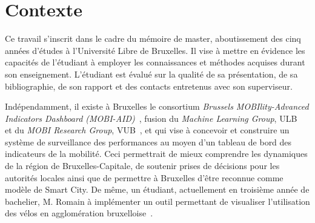 \section{Contexte}

Ce travail s'inscrit dans le cadre du mémoire de master, aboutissement des cinq années d'études à l'Université Libre de Bruxelles. Il vise à mettre en évidence les capacités de l'étudiant à employer les connaissances et méthodes acquises durant son enseignement. L'étudiant est évalué sur la qualité de sa présentation, de sa bibliographie, de son rapport et des contacts entretenus avec son superviseur.

Indépendamment, il existe à Bruxelles le consortium \textit{Brussels MOBIlity-Advanced Indicators
Dashboard (MOBI-AID)}~\cite{MobiAid}, fusion du \textit{Machine Learning Group}, ULB~\cite{MLG} et du \textit{MOBI Research Group}, VUB~\cite{MOBI}, et qui vise à concevoir et construire un système de surveillance des performances au moyen d'un tableau de bord des indicateurs de la mobilité. Ceci permettrait de mieux comprendre les dynamiques de la région de Bruxelles-Capitale, de soutenir prises de décisions pour les autorités locales ainsi que de permettre à Bruxelles d'être reconnue comme modèle de Smart City. De même, un étudiant, actuellement en troisième année de bachelier, M. Romain à implémenter un outil permettant de visualiser l'utilisation des vélos en agglomération bruxelloise~\cite{Villo}.

\makenomenclature

\renewcommand{\nompreamble}{La liste suivante décrit certains symboles qui seront employés par la suite:}

